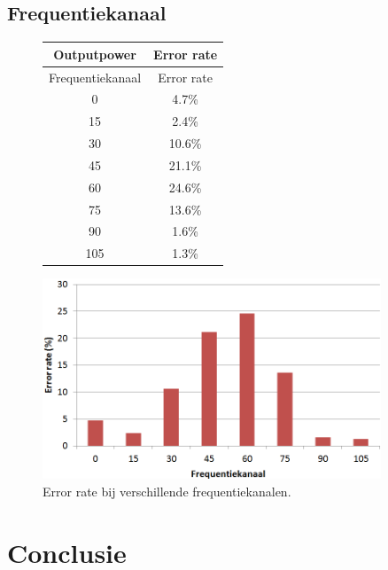 \documentclass[a4paper,10pt]{article}
\begin{document}
\subsection{Frequentiekanaal}
\begin{figure}[h!]
    \begin{minipage}{\textwidth}
        \begin{minipage}{0.49\textwidth}
            \centering
            \begin{tabular}{cc} \hline
                Outputpower &  Error rate           \\ \hline
                Frequentiekanaal    &  Error rate   \\ \hline
                0                   &  4.7\%        \\
                15                  &  2.4\%        \\
                30                  &  10.6\%       \\
                45                  &  21.1\%       \\
                60                  &  24.6\%       \\
                75                  &  13.6\%       \\
                90                  &  1.6\%        \\
                105                 &  1.3\%        \\ \hline
            \end{tabular}
        \end{minipage}
        \hfill
        \begin{minipage}{0.49\textwidth}
            \centering
            \includegraphics[width=0.9\textwidth]{frequentiekanaal.png}
        \end{minipage}
        \caption{Error rate bij verschillende frequentiekanalen.}
    \end{minipage}
\end{figure}

\section{Conclusie}


\end{document}
